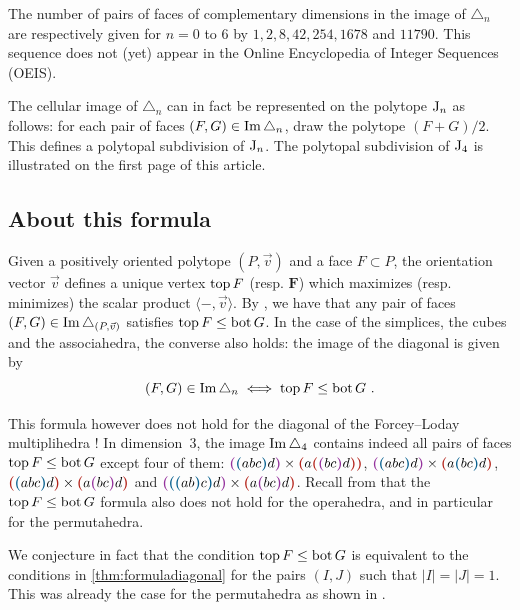 \documentclass[twoside, 12pt]{amsart}
\theoremstyle{remark}
\begin{document}
\medskip

\noindent The number of pairs of faces of complementary dimensions in the image of $\triangle_n$ are respectively given for $n=0$ to $6$ by $1,2,8,42,254,1678$ and $11 790$. This sequence does not (yet) appear in the Online Encyclopedia of Integer Sequences (OEIS). 

\medskip

The cellular image of $\triangle_n$ can in fact be represented on the polytope $\mathrm{J}_n$ as follows: for each pair of faces $(F,G) \in \operatorname{Im} \triangle_n$, draw the polytope $(F+G)/2$. 
This defines a polytopal subdivision of $\mathrm{J}_n$.
The polytopal subdivision of $\mathrm{J}_4$ is illustrated on the first page of this article. 

\subsection{About this formula} \label{ss:about}

Given a positively oriented polytope $(P, \vec v)$ and a face $F \subset P$, the orientation vector $\vec v$ defines a unique vertex $\operatorname{top} F$ (resp. $\bm F$) which maximizes (resp. minimizes) the scalar product $\langle - , \vec v \rangle$. 
By \cite[Proposition 1.15]{LA21}, we have that any pair of faces $(F,G) \in \operatorname{Im} \triangle_{(P,\vec v)}$ satisfies $\operatorname{top} F \leq \operatorname{bot} G$. 
In the case of the simplices, the cubes and the associahedra, the converse also holds: the image of the diagonal is given by $$(F,G) \in \operatorname{Im} \triangle_n \iff \operatorname{top} F\leq \operatorname{bot} G \ . $$

This formula however does not hold for the diagonal of the Forcey--Loday multiplihedra ! 
In dimension~$3$, the image $\operatorname{Im} \triangle_4$ contains indeed all pairs of faces $\operatorname{top} F\leq \operatorname{bot} G$ except four of them: $\purple{\blue{abc}d} \times \red{a\red{\purple{bc}d}}$, $\purple{\blue{abc}d} \times \red{a\blue{bc}d}$, $\red{\blue{abc}d} \times \red{a\purple{bc}d}$ and $\purple{\blue{\blue{ab}c}d} \times \red{a\purple{bc}d}$.
Recall from \cite{LA21} that the $\operatorname{top} F\leq \operatorname{bot} G$ formula also does not hold for the operahedra, and in particular for the permutahedra.

We conjecture in fact that the condition $\operatorname{top} F\leq \operatorname{bot} G$ is equivalent to the conditions in \cref{thm:formuladiagonal} for the pairs $(I,J)$ such that $|I|=|J|=1$. This was already the case for the permutahedra as shown in \cite[Proposition 3.17]{LA21}. 
\end{document}
